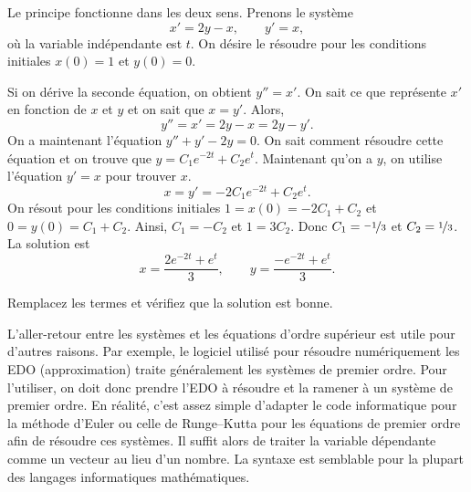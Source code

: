 \begin{example}
Le principe fonctionne dans les deux sens. Prenons le système
\begin{equation*}
x' = 2y-x , \qquad
y' = x, 
\end{equation*}
où la variable indépendante est $t$.  On désire le résoudre pour les conditions initiales $x(0) = 1$ et $y(0) =0$.

Si on dérive la seconde équation, on obtient
$y''=x'$.  On sait ce que représente $x'$ en fonction de $x$ et $y$ et on sait que $x=y'$.  Alors,
\begin{equation*}
y'' = x' = 2y-x = 2y-y' .
\end{equation*}
On a maintenant l'équation $y''+y'-2y = 0$.  On sait comment résoudre cette équation et on trouve que $y = C_1 e^{-2t} + C_2 e^t$.  Maintenant qu'on a $y$,
on utilise l'équation $y' = x$ pour trouver $x$.
\begin{equation*}
x = y' = -2 C_1 e^{-2t} + C_2 e^t .
\end{equation*}
On résout pour les conditions initiales $1 = x(0) = -2 C_1 + C_2$
et $0 = y(0) = C_1 + C_2$.  Ainsi, $C_1 = -C_2$ et $1 = 3C_2$.
Donc $C_1 = \nicefrac{-1}{3}$ et $C_2 = \nicefrac{1}{3}$.  La solution est
\begin{equation*}
x = \frac{2e^{-2t} + e^t}{3} ,\qquad
y = \frac{-e^{-2t} + e^t}{3} .
\end{equation*}
\end{example}

\begin{exercise}
Remplacez les termes et vérifiez que la solution est bonne.
\end{exercise}

L’aller-retour entre les systèmes et les équations d'ordre supérieur est utile pour d’autres raisons. Par exemple, le logiciel utilisé pour résoudre numériquement les EDO (approximation) traite généralement les systèmes de premier ordre. Pour l’utiliser, on doit donc prendre l’EDO à résoudre et la ramener à un système de premier ordre. En réalité, c’est assez simple d’adapter le code informatique pour la méthode d’Euler ou celle de Runge–Kutta pour les équations de premier ordre afin de résoudre ces systèmes. Il suffit alors de traiter la variable dépendante comme un vecteur au lieu d’un nombre. La syntaxe est semblable pour la plupart des langages informatiques mathématiques.


